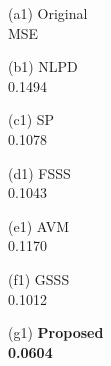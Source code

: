 \documentclass[10pt,journal]{IEEEtran}
\theoremstyle{plain}
\begin{document}
\begin{figure}[!t]
\begin{center}
      \begin{minipage}[t]{0.135\hsize}
        \centering \vspace*{-0.4cm} 
        \small{(a1) Original \\ MSE} \vspace*{0.1cm}
      \end{minipage} 
      \begin{minipage}[t]{0.135\hsize}
        \centering \vspace*{-0.4cm}
        \small{(b1) NLPD~\cite{Chen2015Discrete}} \\ 0.1494 \vspace*{0.1cm}
      \end{minipage} 
      \begin{minipage}[t]{0.135\hsize}
        \centering \vspace*{-0.4cm}
        \small{(c1) SP~\cite{Anis2016Efficient}} \\ 0.1078
      \end{minipage} 
      \begin{minipage}[t]{0.135\hsize}
        \centering \vspace*{-0.4cm}
        \small{(d1) FSSS~\cite{Sakiyama2019Eigendecomposition}} \\ 0.1043 \vspace*{0.1cm}
      \end{minipage} 
      \begin{minipage}[t]{0.135\hsize}
        \centering \vspace*{-0.4cm}
        \small{(e1) AVM~\cite{Jayawant2022Practical}} \\ 0.1170 \vspace*{0.1cm}
      \end{minipage} 
      \begin{minipage}[t]{0.135\hsize}
        \centering \vspace*{-0.4cm}
        \small{(f1) GSSS~\cite{Hara2022GSSS}} \\ 0.1012 \vspace*{0.1cm}
      \end{minipage} 
      \begin{minipage}[t]{0.135\hsize}
        \centering \vspace*{-0.4cm}
        \small{(g1) \textbf{Proposed\\0.0604}} \vspace*{0.1cm}
      \end{minipage} 
      \vspace{0.1cm}
   

\end{center}
\end{figure}
\end{document}
